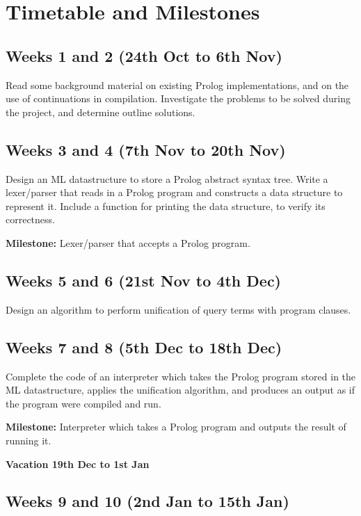 \documentclass[12pt]{article}
\begin{document}
\section*{Timetable and Milestones}

\subsection*{Weeks 1 and 2 (24th Oct to 6th Nov)}

Read some background material on existing Prolog implementations, and on the use of continuations in compilation. Investigate the problems to be solved during the project, and determine outline solutions.

\subsection*{Weeks 3 and 4 (7th Nov to 20th Nov)}

Design an ML datastructure to store a Prolog abstract syntax tree. Write a lexer/parser that reads in a Prolog program and constructs a data structure to represent it. Include a function for printing the data structure, to verify its correctness.

\textbf{Milestone:} Lexer/parser that accepts a Prolog program.

\subsection*{Weeks 5 and 6 (21st Nov to 4th Dec)}

Design an algorithm to perform unification of query terms with program clauses.

\subsection*{Weeks 7 and 8 (5th Dec to 18th Dec)}

Complete the code of an interpreter which takes the Prolog program stored in the ML datastructure, applies the unification algorithm, and produces an output as if the program were compiled and run.

\textbf{Milestone:} Interpreter which takes a Prolog program and outputs the result of running it.

\textbf{Vacation 19th Dec to 1st Jan}

\subsection*{Weeks 9 and 10 (2nd Jan to 15th Jan)}
\end{document}
